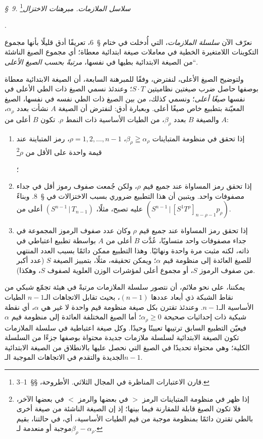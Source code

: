\documentclass[11pt]{article}
\providecommand{\glqq}{\textquotedblbase}
\providecommand{\grqq}{\textquotedblleft}
\newcommand{\srcLTR}[1]{\relax\ifmmode\text{\mbox{\babelsublr{\foreignlanguage{english}{#1}}}}\else\babelsublr{\foreignlanguage{english}{#1}}\fi}
\newcommand{\srcfn}[2]{\begingroup\renewcommand{\thefootnote}{\srcLTR{#1}}\footnote{#2}\addtocounter{footnote}{-1}\endgroup}
\providecommand{\pair}[2]{(#1\,|\,#2)}
\begin{document}
\begin{center}
\emph{\S\ 9. سلاسل الملازمات. مبرهنات الاختزال}\srcfn{*)}{قارن الاعتبارات المناظرة في المجال الثلاثي. الأطروحة، \S\S\ 1--3.}.
\end{center}
نعرّف الآن \emph{سلسلة الملازمات}، التي أُدخلت في ختام \S\ 6، تعريفًا أدق قليلًا بأنها \glqq{}مجموع التكوينات اللامتغيرة الخطية في معاملات صيغة ابتدائية معطاة؛ أي مجموع الصيغ الناشئة من الصيغة الابتدائية بطيها في نفسها، \emph{مرتبةً بحسب الصيغ الأعلى}\grqq{}.

ولتوضيح الصيغ الأعلى، لنفترض، وفقًا للمبرهنة السابعة، أن الصيغة الابتدائية معطاة بوصفها حاصل ضرب صيغتين نظاميتين $S\cdot T$؛ وعندئذ نسمي الصيغ ذات الطي الأعلى في نفسها \emph{صيغًا أعلى}؛ ونسمي كذلك، من بين الصيغ ذات الطي نفسه في نفسها، الصيغ المعيّنة بتطبيع خاص صيغًا أعلى. وبعبارة أدق: لنفترض أن الصيغة $A$ نشأت بعدد $\alpha_\rho$، والصيغة $B$ بعدد $\beta_\rho$، من الطيات الأساسية ذات النمط $\rho$. تكون $B$ أعلى من $A$:
\begin{enumerate}
\renewcommand{\labelenumi}{\arabic{enumi})}
\item إذا تحقق في منظومة المتباينات $\beta_\rho\geqq\alpha_\rho$، $\rho=1,2,\ldots,n-1$، رمز المتباينة عند قيمة واحدة على الأقل من $\rho$\srcfn{**)}{إذا ظهر في منظومة المتباينات الرمز $>$ في بعضها والرمز $<$ في بعضها الآخر، فلا تكون الصيغ قابلة للمقارنة فيما بينها؛ إذ إن الصيغة الناشئة من صيغة أخرى بالطي تقترن دائمًا بمنظومة موجبة من قيم الطيات الأساسية، أي، في حالتنا، بقيم موجبة أو منعدمة لـ$\beta_\rho-\alpha_\rho$.}؛
\item إذا تحقق رمز المساواة عند جميع قيم $\rho$، ولكن جُمعت صفوف رموز أقل في جداء مصفوفات واحد. ويتبين أن هذا التطبيع ضروري بسبب الاختزالات في \S\ 8. وبناءً عليه تصبح، مثلًا، $\pair{S^{n-1}}{T_{n-1}}$ أعلى من $\pair{S^{n-1}}{[S^1T^\rho]_{n-\rho-1}p_\rho}$.
\item إذا تحقق رمز المساواة عند جميع قيم $\rho$ وكان عدد صفوف الرموز المجموعة في جداء مصفوفات واحد متساويًا، عُدَّت $B$ أعلى من $A$ بواسطة تطبيع اعتباطي في ذاته، لكنه مثبت مرة واحدة ونهائيًا. وهذا التطبيع ممكن دائمًا بسبب العدد المنتهي للصيغ العائدة إلى منظومة قيم $\alpha$؛ ويمكن تحقيقه، مثلًا، بتمييز الصيغة $S$ (عدد أكبر من صفوف الرموز $S$، أو مجموع أعلى لمؤشرات الوزن العلوية لصفوف $S$، وهكذا).
\end{enumerate}
يمكننا، على نحو ملائم، أن نتصور سلسلة الملازمات مرتبةً في هيئة تجمّع شبكي من نقاط الشبكة ذي أبعاد عددها $(n-1)$، بحيث تقابل الاتجاهات الـ$n-1$ الطيات الأساسية الـ$n-1$. وعندئذ تقترن بكل صيغة منظومة قيم واحدة لا غير هي $\alpha$، أي نقطة شبكية ذات إحداثيات صحيحة $\alpha_\rho\ge0$؛ أما الصيغ المختلفة العائدة إلى منظومة قيم $\alpha$ فيعيّن التطبيع السابق ترتيبها تعيينًا وحيدًا. وكل صيغة اعتباطية في سلسلة الملازمات تكون الصيغة الابتدائية لسلسلة ملازمات جديدة محتواة بوصفها جزءًا من السلسلة الكلية؛ وهي محتواة تحديدًا في الصيغ التي نحصل عليها بالانطلاق من الصيغة الابتدائية الجديدة والتقدم في الاتجاهات الموجبة الـ$n-1$.
\end{document}

